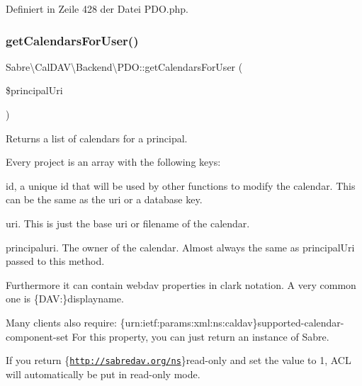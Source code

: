 Definiert in Zeile 428 der Datei P\+D\+O.\+php.

\mbox{\label{class_sabre_1_1_cal_d_a_v_1_1_backend_1_1_p_d_o_a6a5e51f95be75f19eecbd13c6bb90bbc}} 
\subsubsection{\texorpdfstring{get\+Calendars\+For\+User()}{getCalendarsForUser()}}
{\footnotesize\ttfamily Sabre\textbackslash{}\+Cal\+D\+A\+V\textbackslash{}\+Backend\textbackslash{}\+P\+D\+O\+::get\+Calendars\+For\+User (\begin{DoxyParamCaption}\item[{}]{\$principal\+Uri }\end{DoxyParamCaption})}

Returns a list of calendars for a principal.

Every project is an array with the following keys\+:
\begin{DoxyItemize}
\item id, a unique id that will be used by other functions to modify the calendar. This can be the same as the uri or a database key.
\item uri. This is just the \textquotesingle{}base uri\textquotesingle{} or \textquotesingle{}filename\textquotesingle{} of the calendar.
\item principaluri. The owner of the calendar. Almost always the same as principal\+Uri passed to this method.
\end{DoxyItemize}

Furthermore it can contain webdav properties in clark notation. A very common one is \textquotesingle{}\{D\+AV\+:\}displayname\textquotesingle{}.

Many clients also require\+: \{urn\+:ietf\+:params\+:xml\+:ns\+:caldav\}supported-\/calendar-\/component-\/set For this property, you can just return an instance of Sabre.

If you return \{\href{http://sabredav.org/ns}{\tt http\+://sabredav.\+org/ns}\}read-\/only and set the value to 1, A\+CL will automatically be put in read-\/only mode.



